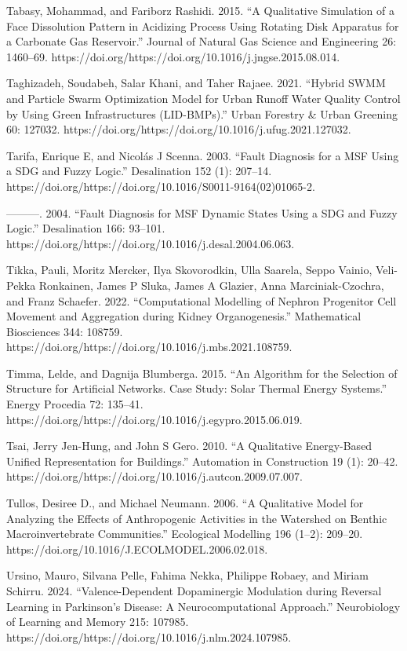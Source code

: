 \documentclass[utf8]{gradu3}
\begin{document}
Tabasy, Mohammad, and Fariborz Rashidi. 2015. “A Qualitative Simulation of a Face Dissolution Pattern in Acidizing Process Using Rotating Disk Apparatus for a Carbonate Gas Reservoir.” Journal of Natural Gas Science and Engineering 26: 1460–69. https://doi.org/https://doi.org/10.1016/j.jngse.2015.08.014.

Taghizadeh, Soudabeh, Salar Khani, and Taher Rajaee. 2021. “Hybrid SWMM and Particle Swarm Optimization Model for Urban Runoff Water Quality Control by Using Green Infrastructures (LID-BMPs).” Urban Forestry \& Urban Greening 60: 127032. https://doi.org/https://doi.org/10.1016/j.ufug.2021.127032.

Tarifa, Enrique E, and Nicolás J Scenna. 2003. “Fault Diagnosis for a MSF Using a SDG and Fuzzy Logic.” Desalination 152 (1): 207–14. https://doi.org/https://doi.org/10.1016/S0011-9164(02)01065-2.

———. 2004. “Fault Diagnosis for MSF Dynamic States Using a SDG and Fuzzy Logic.” Desalination 166: 93–101. https://doi.org/https://doi.org/10.1016/j.desal.2004.06.063.

Tikka, Pauli, Moritz Mercker, Ilya Skovorodkin, Ulla Saarela, Seppo Vainio, Veli-Pekka Ronkainen, James P Sluka, James A Glazier, Anna Marciniak-Czochra, and Franz Schaefer. 2022. “Computational Modelling of Nephron Progenitor Cell Movement and Aggregation during Kidney Organogenesis.” Mathematical Biosciences 344: 108759. https://doi.org/https://doi.org/10.1016/j.mbs.2021.108759.

Timma, Lelde, and Dagnija Blumberga. 2015. “An Algorithm for the Selection of Structure for Artificial Networks. Case Study: Solar Thermal Energy Systems.” Energy Procedia 72: 135–41. https://doi.org/https://doi.org/10.1016/j.egypro.2015.06.019.

Tsai, Jerry Jen-Hung, and John S Gero. 2010. “A Qualitative Energy-Based Unified Representation for Buildings.” Automation in Construction 19 (1): 20–42. https://doi.org/https://doi.org/10.1016/j.autcon.2009.07.007.

Tullos, Desiree D., and Michael Neumann. 2006. “A Qualitative Model for Analyzing the Effects of Anthropogenic Activities in the Watershed on Benthic Macroinvertebrate Communities.” Ecological Modelling 196 (1–2): 209–20. https://doi.org/10.1016/J.ECOLMODEL.2006.02.018.

Ursino, Mauro, Silvana Pelle, Fahima Nekka, Philippe Robaey, and Miriam Schirru. 2024. “Valence-Dependent Dopaminergic Modulation during Reversal Learning in Parkinson’s Disease: A Neurocomputational Approach.” Neurobiology of Learning and Memory 215: 107985. https://doi.org/https://doi.org/10.1016/j.nlm.2024.107985.
\end{document}
